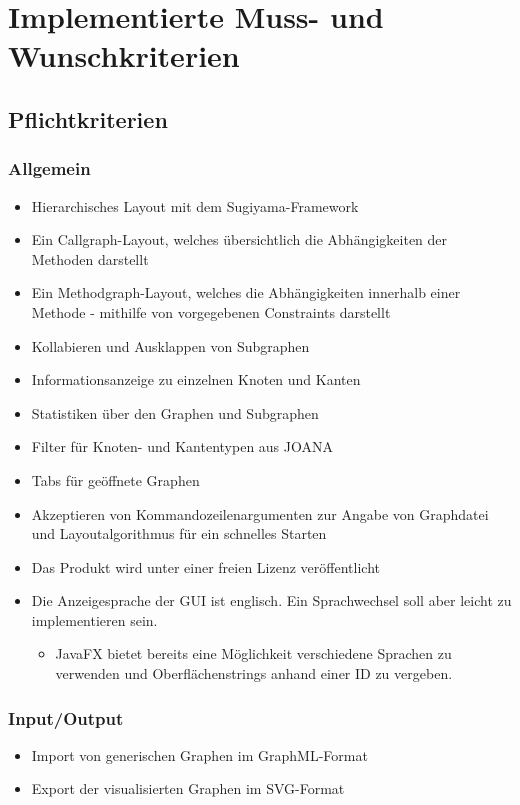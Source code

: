 \chapter{Implementierte Muss- und Wunschkriterien}
\label{ch:implkrit}

\section{Pflichtkriterien}

\subsection{Allgemein}
\begin{itemize}
	\item Hierarchisches Layout mit dem Sugiyama-Framework
	\item Ein Callgraph-Layout, welches übersichtlich die Abhängigkeiten der Methoden darstellt
	\item Ein Methodgraph-Layout, welches die Abhängigkeiten innerhalb einer Methode - mithilfe von vorgegebenen Constraints darstellt
	\item Kollabieren und Ausklappen von Subgraphen
	\item Informationsanzeige zu einzelnen Knoten und Kanten
	\item Statistiken über den Graphen und Subgraphen
	\item Filter für Knoten- und Kantentypen aus JOANA
	\item Tabs für geöffnete Graphen
	\item Akzeptieren von Kommandozeilenargumenten zur Angabe von Graphdatei und Layoutalgorithmus für ein schnelles Starten
	\item Das Produkt wird unter einer freien Lizenz veröffentlicht
	\item Die Anzeigesprache der GUI ist englisch. Ein Sprachwechsel soll aber leicht zu implementieren sein.
	\begin{itemize}
		\item JavaFX bietet bereits eine Möglichkeit verschiedene Sprachen zu verwenden und Oberflächenstrings anhand einer ID zu vergeben.
	\end{itemize}
\end{itemize}

\subsection{Input/Output}
\begin{itemize}
	\item Import von generischen Graphen im GraphML-Format
	\item Export der visualisierten Graphen im SVG-Format
\end{itemize}

